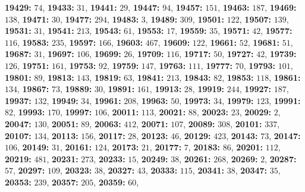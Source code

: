 \textsf{\bfseries 19429:} $74$, \textsf{\bfseries 19433:} $31$, \textsf{\bfseries 19441:} $29$, \textsf{\bfseries 19447:} $94$, \textsf{\bfseries 19457:} $151$, \textsf{\bfseries 19463:} $187$, \textsf{\bfseries 19469:} $138$, \textsf{\bfseries 19471:} $30$, \textsf{\bfseries 19477:} $294$, \textsf{\bfseries 19483:} $3$, \textsf{\bfseries 19489:} $309$, \textsf{\bfseries 19501:} $122$, \textsf{\bfseries 19507:} $139$, \textsf{\bfseries 19531:} $31$, \textsf{\bfseries 19541:} $213$, \textsf{\bfseries 19543:} $61$, \textsf{\bfseries 19553:} $17$, \textsf{\bfseries 19559:} $35$, \textsf{\bfseries 19571:} $42$, \textsf{\bfseries 19577:} $116$, \textsf{\bfseries 19583:} $235$, \textsf{\bfseries 19597:} $166$, \textsf{\bfseries 19603:} $467$, \textsf{\bfseries 19609:} $122$, \textsf{\bfseries 19661:} $52$, \textsf{\bfseries 19681:} $51$, \textsf{\bfseries 19687:} $31$, \textsf{\bfseries 19697:} $106$, \textsf{\bfseries 19699:} $26$, \textsf{\bfseries 19709:} $116$, \textsf{\bfseries 19717:} $50$, \textsf{\bfseries 19727:} $42$, \textsf{\bfseries 19739:} $126$, \textsf{\bfseries 19751:} $161$, \textsf{\bfseries 19753:} $92$, \textsf{\bfseries 19759:} $147$, \textsf{\bfseries 19763:} $111$, \textsf{\bfseries 19777:} $70$, \textsf{\bfseries 19793:} $101$, \textsf{\bfseries 19801:} $89$, \textsf{\bfseries 19813:} $143$, \textsf{\bfseries 19819:} $63$, \textsf{\bfseries 19841:} $213$, \textsf{\bfseries 19843:} $82$, \textsf{\bfseries 19853:} $118$, \textsf{\bfseries 19861:} $134$, \textsf{\bfseries 19867:} $73$, \textsf{\bfseries 19889:} $30$, \textsf{\bfseries 19891:} $161$, \textsf{\bfseries 19913:} $28$, \textsf{\bfseries 19919:} $244$, \textsf{\bfseries 19927:} $187$, \textsf{\bfseries 19937:} $132$, \textsf{\bfseries 19949:} $34$, \textsf{\bfseries 19961:} $208$, \textsf{\bfseries 19963:} $50$, \textsf{\bfseries 19973:} $34$, \textsf{\bfseries 19979:} $123$, \textsf{\bfseries 19991:} $82$, \textsf{\bfseries 19993:} $170$, \textsf{\bfseries 19997:} $106$, \textsf{\bfseries 20011:} $113$, \textsf{\bfseries 20021:} $88$, \textsf{\bfseries 20023:} $23$, \textsf{\bfseries 20029:} $2$, \textsf{\bfseries 20047:} $130$, \textsf{\bfseries 20051:} $89$, \textsf{\bfseries 20063:} $412$, \textsf{\bfseries 20071:} $107$, \textsf{\bfseries 20089:} $308$, \textsf{\bfseries 20101:} $337$, \textsf{\bfseries 20107:} $134$, \textsf{\bfseries 20113:} $156$, \textsf{\bfseries 20117:} $28$, \textsf{\bfseries 20123:} $46$, \textsf{\bfseries 20129:} $423$, \textsf{\bfseries 20143:} $73$, \textsf{\bfseries 20147:} $106$, \textsf{\bfseries 20149:} $31$, \textsf{\bfseries 20161:} $124$, \textsf{\bfseries 20173:} $21$, \textsf{\bfseries 20177:} $7$, \textsf{\bfseries 20183:} $86$, \textsf{\bfseries 20201:} $112$, \textsf{\bfseries 20219:} $481$, \textsf{\bfseries 20231:} $273$, \textsf{\bfseries 20233:} $15$, \textsf{\bfseries 20249:} $38$, \textsf{\bfseries 20261:} $268$, \textsf{\bfseries 20269:} $2$, \textsf{\bfseries 20287:} $57$, \textsf{\bfseries 20297:} $109$, \textsf{\bfseries 20323:} $38$, \textsf{\bfseries 20327:} $43$, \textsf{\bfseries 20333:} $115$, \textsf{\bfseries 20341:} $38$, \textsf{\bfseries 20347:} $35$, \textsf{\bfseries 20353:} $239$, \textsf{\bfseries 20357:} $205$, \textsf{\bfseries 20359:} $60$, 
